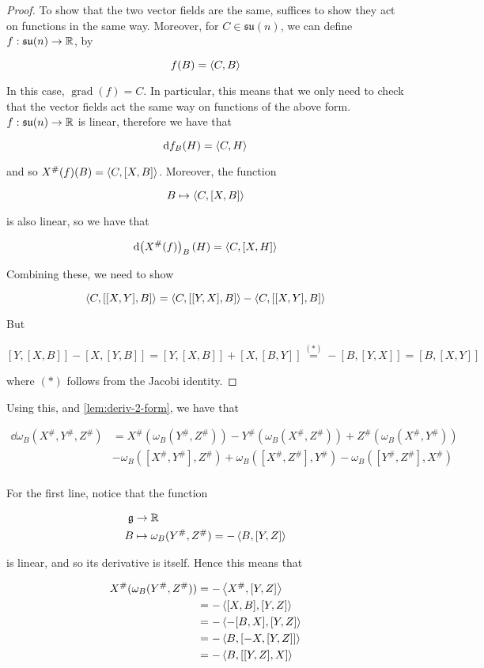 \documentclass{report}
\newcommand{\su}{\mathfrak{su}}
\DeclareMathOperator{\gr}{grad}
\begin{document}
\begin{proof}
    To show that the two vector fields are the same, suffices to show they act on functions in the same way. Moreover, for \(C \in \su(n)\), we can define \(f : \su(n) \to \R\), by 
    
    \[f(B) = \left\langle C, B \right\rangle\]
    
    In this case, \(\gr(f) = C\). In particular, this means that we only need to check that the vector fields act the same way on functions of the above form. \(f : \su(n) \to \R\) is linear, therefore we have that
    
    \[\dd f_B(H) = \left\langle C, H \right\rangle\]

    and so \(X^\#(f)(B) = \left\langle C, [X, B] \right\rangle\). Moreover, the function

    \[B \mapsto \left\langle C, [X, B] \right\rangle\]

    is also linear, so we have that

    \[\dd(X^\#(f))_B(H) = \left\langle C, [X, H] \right\rangle\]

    Combining these, we need to show

    \[\left\langle C, [[X, Y], B] \right\rangle = \left\langle C, [[Y, X], B] \right\rangle - \left\langle C, [[X, Y], B] \right\rangle\]

    But

    \[[Y, [X, B]] - [X, [Y, B]] = [Y, [X, B]] + [X, [B, Y]] \stackrel{(*)}{=} -[B, [Y, X]] = [B, [X, Y]]\]

    where \((*)\) follows from the Jacobi identity.
\end{proof}

Using this, and \cref{lem:deriv-2-form}, we have that

\begin{align*}
    \dd\omega_B(X^\#, Y^\#, Z^\#) &= X^\#(\omega_B(Y^\#, Z^\#)) - Y^\#(\omega_B(X^\#, Z^\#)) + Z^\#(\omega_B(X^\#, Y^\#)) \\
    &- \omega_B([X^\#, Y^\#], Z^\#) + \omega_B([X^\#, Z^\#], Y^\#) - \omega_B([Y^\#, Z^\#], X^\#) \\
\end{align*}

For the first line, notice that the function

\begin{align*}
    \mathfrak{g} &\to \mathbb{R} \\
    B &\mapsto \omega_B(Y^\#, Z^\#) = -\left\langle B, [Y, Z] \right\rangle
\end{align*}

is linear, and so its derivative is itself. Hence this means that

\begin{align*}
    X^\#(\omega_B(Y^\#, Z^\#)) &= -\left\langle X^\#, [Y, Z] \right\rangle \\
    &= -\left\langle [X, B], [Y, Z] \right\rangle \\
    &= -\left\langle -[B, X], [Y, Z] \right\rangle \\
    &= -\left\langle B, [-X, [Y, Z]] \right\rangle \\
    &= -\left\langle B, [[Y, Z], X] \right\rangle
\end{align*}
\end{document}
